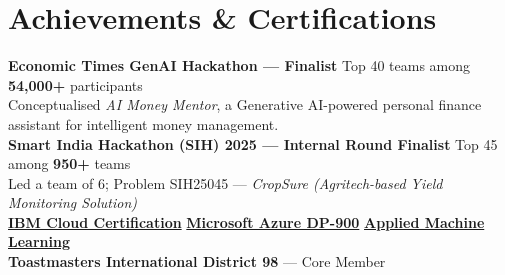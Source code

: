 \documentclass[a4paper,10pt]{article}
\begin{document}
\section*{Achievements \& Certifications}

\textbf{Economic Times GenAI Hackathon — Finalist} \hfill Top 40 teams among \textbf{54,000+} participants \\
Conceptualised \textit{AI Money Mentor}, a Generative AI-powered personal finance assistant for intelligent money management.\\[1pt]
\textbf{Smart India Hackathon (SIH) 2025 — Internal Round Finalist} \hfill Top 45 among \textbf{950+} teams \\
Led a team of 6; Problem SIH25045 — \textit{CropSure (Agritech-based Yield Monitoring Solution)}\\[2pt]
\href{https://drive.google.com/file/d/1nJgje4vZxcNtsqLTKuxIoYp7DiF-zvzB/view}{\textbf{IBM Cloud Certification}} \quad
\href{https://drive.google.com/file/d/1SBtQgRox6sEIGRugTdNBI5toU2U0P_uY/view}{\textbf{Microsoft Azure DP-900}} \quad
\href{https://drive.google.com/file/d/18-BCNgeCV2zP9asABbYR7Ii_LlSqTMuU/view?usp=drive_link}{\textbf{Applied Machine Learning }} \\[2pt]
\textbf{Toastmasters International District 98} — Core Member

\end{document}
